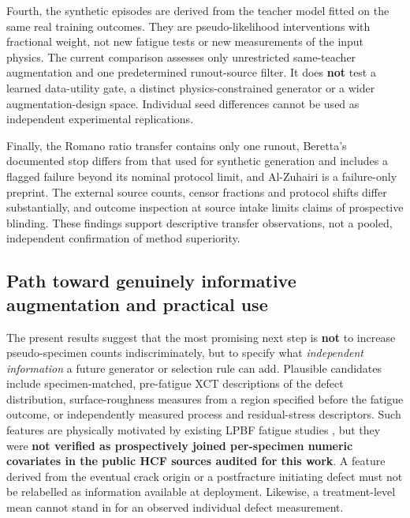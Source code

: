 \documentclass[12pt,a4paper]{article}
\begin{document}
Fourth, the synthetic episodes are derived from the teacher model fitted on the same real training outcomes. They are pseudo-likelihood interventions with fractional weight, not new fatigue tests or new measurements of the input physics. The current comparison assesses only unrestricted same-teacher augmentation and one predetermined runout-source filter. It does \textbf{not} test a learned data-utility gate, a distinct physics-constrained generator or a wider augmentation-design space. Individual seed differences cannot be used as independent experimental replications.

Finally, the Romano ratio transfer contains only one runout, Beretta's documented stop differs from that used for synthetic generation and includes a flagged failure beyond its nominal protocol limit, and Al-Zuhairi is a failure-only preprint. The external source counts, censor fractions and protocol shifts differ substantially, and outcome inspection at source intake limits claims of prospective blinding. These findings support descriptive transfer observations, not a pooled, independent confirmation of method superiority.

\subsection{Path toward genuinely informative augmentation and practical use}

The present results suggest that the most promising next step is \textbf{not} to increase pseudo-specimen counts indiscriminately, but to specify what \emph{independent information} a future generator or selection rule can add. Plausible candidates include specimen-matched, pre-fatigue XCT descriptions of the defect distribution, surface-roughness measures from a region specified before the fatigue outcome, or independently measured process and residual-stress descriptors. Such features are physically motivated by existing LPBF fatigue studies \cite{wu2021,vanderrest2025}, but they were \textbf{not verified as prospectively joined per-specimen numeric covariates in the public HCF sources audited for this work}. A feature derived from the eventual crack origin or a postfracture initiating defect must not be relabelled as information available at deployment. Likewise, a treatment-level mean cannot stand in for an observed individual defect measurement.
\end{document}
